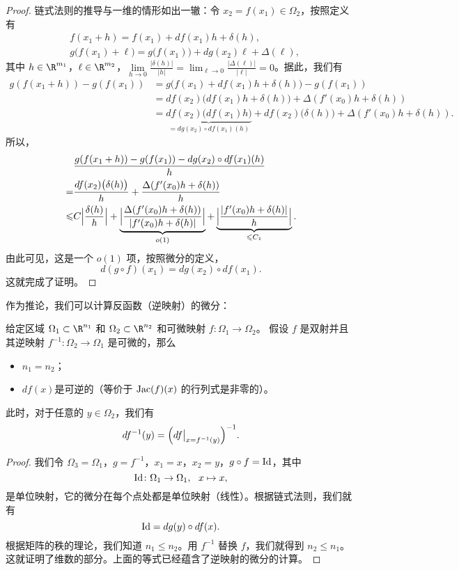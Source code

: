 \begin{proof}
链式法则的推导与一维的情形如出一辙：令 $x_2=f(x_1)\in \Omega_2$，按照定义有
\begin{align*}
&f(x_1+h)=f(x_1)+df(x_1)h+\delta(h), \\ 
&g\bigl(f(x_1)+\ell\bigr)=g\bigl(f(x_1)\bigr)+dg(x_2)\ell +\Delta(\ell),
\end{align*}
其中 $h\in \R^{m_1}$，$\ell\in \R^{m_2}$，$\lim\limits_{h \rightarrow 0}\frac{|\delta(h)|}{|h|}=\lim_{\ell \rightarrow 0}\frac{|\Delta(\ell)|}{|\ell|}=0$。据此，我们有
\begin{align*}
g(f(x_1+h))-g(f(x_1))&=g\bigl(f(x_1)+df(x_1)h+\delta(h)\bigr)-g(f(x_1))\\
&=df(x_2)\bigl(df(x_1)h+\delta(h)\bigr)+\Delta(f'(x_0)h+\delta(h))\\
&=\underbrace{df(x_2)\bigl(df(x_1)h\bigr)}_{=dg(x_2)\circ df(x_1)(h)}+df(x_2)\bigl(\delta(h)\bigr)+\Delta(f'(x_0)h+\delta(h)).
\end{align*}
所以，
\begin{align*}
&\frac{g(f(x_1+h))-g(f(x_1))-dg(x_2)\circ df(x_1)(h)}{h}\\
=&\frac{df(x_2)\bigl(\delta(h)\bigr)}{h}+\frac{\Delta(f'(x_0)h+\delta(h))}{h}\\
\leqslant & C \Bigl|\frac{\delta(h)}{h}\Bigr|+\underbrace{\Bigl| \frac{\Delta(f'(x_0)h+\delta(h))}{|f'(x_0)h+\delta(h)|}\Bigr|}_{o(1)}+\underbrace{\Bigl|\frac{|f'(x_0)h+\delta(h)|}{h} \Bigr|}_{\leqslant C_1}.
\end{align*}
由此可见，这是一个 $o(1)$ 项，按照微分的定义，
\[d(g\circ f)(x_1) = dg(x_2) \circ df(x_1).\]
这就完成了证明。
\end{proof}

作为推论，我们可以计算反函数（逆映射）的微分：

\begin{coro}
给定区域 $\Omega_1\subset \R^{n_1}$ 和 $\Omega_2\subset \R^{n_2}$ 和可微映射 $f\colon \Omega_1 \rightarrow \Omega_2$。
假设 $f$ 是双射并且其逆映射 $f^{-1}\colon\Omega_2\rightarrow \Omega_1$ 是可微的，那么
\begin{itemize}
\item $n_1=n_2$；
\item $df(x)$是可逆的（等价于 ${\rm Jac}(f)(x)$ 的行列式是非零的）。
\end{itemize}

此时，对于任意的 $y\in \Omega_2$，我们有
\[df^{-1}(y)=\Bigl(df\big |_{x=f^{-1}(y)}\Bigr)^{-1}.\]
\end{coro}
\begin{proof}
我们令 $\Omega_3=\Omega_1$，$g=f^{-1}$，$x_1=x$，$x_2=y$，$g\circ f ={\rm Id}$，其中
\[{\rm Id}\colon{\Omega_1}\rightarrow \Omega_1,  \ \ x\mapsto x,\]
是单位映射，它的微分在每个点处都是单位映射（线性）。根据链式法则，我们就有
\[{\rm Id}= dg(y) \circ df(x).\]
根据矩阵的秩的理论，我们知道 $n_1\leqslant n_2$。用 $f^{-1}$ 替换 $f$，我们就得到 $n_2\leqslant n_1$。这就证明了维数的部分。上面的等式已经蕴含了逆映射的微分的计算。
\end{proof}

